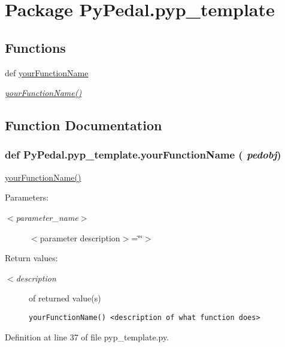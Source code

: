 \hypertarget{namespacePyPedal_1_1pyp__template}{
\section{Package Py\-Pedal.pyp\_\-template}
\label{namespacePyPedal_1_1pyp__template}
}


\subsection*{Functions}
\begin{CompactItemize}
\item 
def \hyperlink{namespacePyPedal_1_1pyp__template_fbb31bac29cdcc8b3439f3c0be6a7f79}{your\-Function\-Name}
\begin{CompactList}\small\item\em \hyperlink{namespacePyPedal_1_1pyp__template_fbb31bac29cdcc8b3439f3c0be6a7f79}{your\-Function\-Name()}  \item\end{CompactList}\end{CompactItemize}


\subsection{Function Documentation}
\hypertarget{namespacePyPedal_1_1pyp__template_fbb31bac29cdcc8b3439f3c0be6a7f79}{
\subsubsection[yourFunctionName]{\setlength{\rightskip}{0pt plus 5cm}def Py\-Pedal.pyp\_\-template.your\-Function\-Name ( {\em pedobj})}}
\label{namespacePyPedal_1_1pyp__template_fbb31bac29cdcc8b3439f3c0be6a7f79}


\hyperlink{namespacePyPedal_1_1pyp__template_fbb31bac29cdcc8b3439f3c0be6a7f79}{your\-Function\-Name()}  

\begin{Desc}
\item[Parameters:]
\begin{description}
\item[{\em $<$parameter\_\-name$>$}]$<$parameter description$>$=\char`\"{}\char`\"{}$>$ \end{description}
\end{Desc}
\begin{Desc}
\item[Return values:]
\begin{description}
\item[{\em $<$description}]of returned value(s)

\footnotesize\begin{verbatim}yourFunctionName() <description of what function does>
\end{verbatim}
\normalsize
 \end{description}
\end{Desc}


Definition at line 37 of file pyp\_\-template.py.